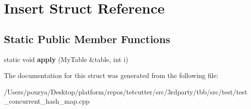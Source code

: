 \hypertarget{structInsert}{}\section{Insert Struct Reference}
\label{structInsert}
\subsection*{Static Public Member Functions}
\begin{DoxyCompactItemize}
\item 
\hypertarget{structInsert_a086725bdc7fbd2fd7e19ffb7c3d150f7}{}static void {\bfseries apply} (My\+Table \&table, int i)\label{structInsert_a086725bdc7fbd2fd7e19ffb7c3d150f7}

\end{DoxyCompactItemize}


The documentation for this struct was generated from the following file\+:\begin{DoxyCompactItemize}
\item 
/\+Users/pourya/\+Desktop/platform/repos/tetcutter/src/3rdparty/tbb/src/test/test\+\_\+concurrent\+\_\+hash\+\_\+map.\+cpp\end{DoxyCompactItemize}
